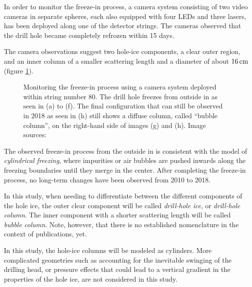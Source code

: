 In order to monitor the freeze-in process, a camera system consisting of
two video cameras in separate spheres, each also equipped with four LEDs
and three lasers, has been deployed along one of the detector strings.
The cameras observed that the drill hole became completely refrozen
within 15 days. \cite{instrumentation}

The camera observations suggest two hole-ice components, a clear outer
region, and an inner column of a smaller scattering length and a
diameter of about \(16\text{\,cm}\) (figure \ref{fig:daeM6yot}).
\cite{rongenswedishcamera,instrumentation}

\begin{figure}[htbp]
  \centering
  \hfill
  \hfill
  \hfill
  \hfill
  \hfill
  \hfill
  \hfill
  \hfill
  \caption{Monitoring the freeze-in process using a camera system deployed within string number 80. The drill hole freezes from outside in as seen in (a) to (f). The final configuration that can still be observed in 2018 as seen in (h) still shows a diffuse column, called \enquote{bubble column}, on the right-hand side of images (g) and (h). Image sources: \cite{icrc17pocam, camera2010, camera2018}}
  \label{fig:daeM6yot}
\end{figure}

The observed freeze-in process from the outside in is consistent with
the model of \textit{cylindrical freezing}, where impurities or air
bubbles are pushed inwards along the freezing boundaries until they
merge in the center. \cite{rongenswedishcamera} After completing the
freeze-in process, no long-term changes have been observed from 2010 to
2018. \cite{instrumentation, camera2010, camera2018}

In this study, when needing to differentiate between the different
components of the hole ice, the outer clear component will be called
\textit{drill-hole ice}, or \textit{drill-hole column}. The inner
component with a shorter scattering length will be called
\textit{bubble column}. Note, however, that there is no established
nomenclature in the context of \icecube publications, yet.

In this study, the hole-ice columns will be modeled as cylinders. More
complicated geometries such as accounting for the inevitable swinging of
the drilling head, or pressure effects that could lead to a vertical
gradient in the properties of the hole ice, are not considered in this
study.\followup
